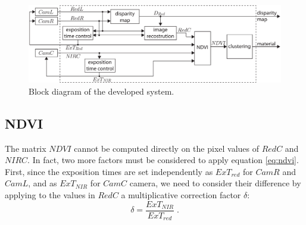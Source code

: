 \documentclass[a4paper, 10pt, conference]{ieeeconf}      %
\begin{document}




\begin{figure}[t]
      \centering
      \includegraphics[width=0.99\linewidth]{../images/diagram_ndvi_plus_disparity.pdf}
      \caption{Block diagram of the developed system.}
     \label{fig:Blockdiagram}
   \end{figure}









\subsection{NDVI}\label{sec:NDVI}

The matrix $NDVI$ cannot be computed directly on the pixel values of $RedC$ and $NIRC$.
In fact, two more factors must be considered to apply equation \eqref{eq:ndvi}.
First, since the exposition times are set independently as $ExT_{red}$ for $CamR$ and $CamL$,  and as $ExT_{NIR}$ for $CamC$ camera, we need to consider their difference by applying to the values in $RedC$ a multiplicative correction factor $\delta$:
%
\begin{equation} \label{exposition}
\delta=\frac{ExT_{NIR}}{ExT_{red}}\;.
\end{equation}
\end{document}
